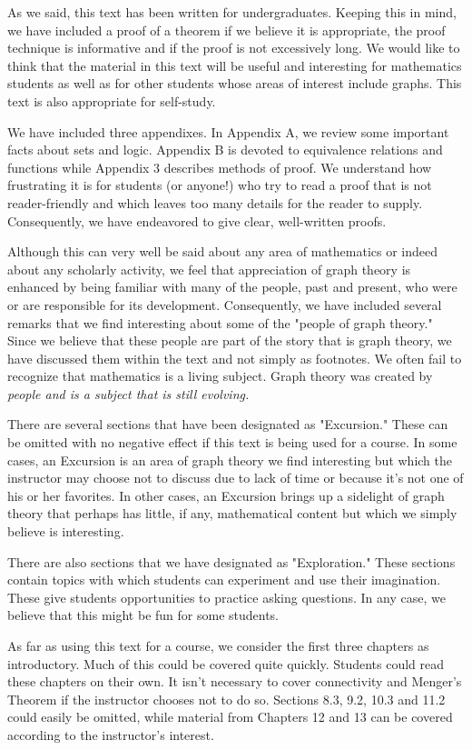 As we said, this text has been written for undergraduates. Keeping this in mind, we have included a proof of a theorem if we believe it is appropriate, the proof technique is informative and if the proof is not excessively long. We would like to think that the material in this text will be useful and interesting for mathematics students as well as for other students whose areas of interest include graphs. This text is also appropriate for self-study.

We have included three appendixes. In Appendix A, we review some important facts about sets and logic. Appendix B is devoted to equivalence relations and functions while Appendix 3 describes methods of proof. We understand how frustrating it is for students (or anyone!) who try to read a proof that is not reader-friendly and which leaves too many details for the reader to supply. Consequently, we have endeavored to give clear, well-written proofs.

Although this can very well be said about any area of mathematics or indeed about any scholarly activity, we feel that appreciation of graph theory is enhanced by being familiar with many of the people, past and present, who were or are responsible for its development. Consequently, we have included several remarks that we find interesting about some of the "people of graph theory." Since we believe that these people are part of the story that is graph theory, we have discussed them within the text and not simply as footnotes. We often fail to recognize that mathematics is a living subject. Graph theory was created by \it{people} and is a subject that is still evolving.

There are several sections that have been designated as "Excursion." These can be omitted with no negative effect if this text is being used for a course. In some cases, an Excursion is an area of graph theory we find interesting but which the instructor may choose not to discuss due to lack of time or because it's not one of his or her favorites. In other cases, an Excursion brings up a sidelight of graph theory that perhaps has little, if any, mathematical content but which we simply believe is interesting.

There are also sections that we have designated as "Exploration." These sections contain topics with which students can experiment and use their imagination. These give students opportunities to practice asking questions. In any case, we believe that this might be fun for some students.

As far as using this text for a course, we consider the first three chapters as introductory. Much of this could be covered quite quickly. Students could read these chapters on their own. It isn't necessary to cover connectivity and Menger's Theorem if the instructor chooses not to do so. Sections 8.3, 9.2, 10.3 and 11.2 could easily be omitted, while material from Chapters 12 and 13 can be covered according to the instructor's interest.

